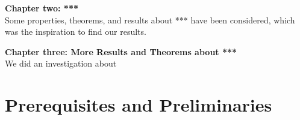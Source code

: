 \documentclass[12pt,a4paper,oneside]{book} %
\theoremstyle{definition}
\begin{document}
\textbf{Chapter two: ***}
\\Some properties, theorems, and results about *** have been considered, which was the inspiration to find our results.

\textbf{Chapter three: More Results and Theorems about ***}
\\We did an investigation about 

\chapter{Prerequisites and Preliminaries}



\renewcommand{\bibname}{References}

\end{document}
